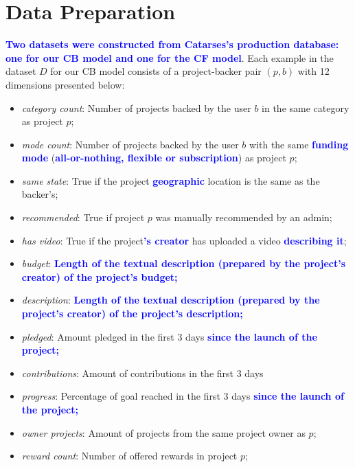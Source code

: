 \documentclass[cic,tc,english]{iiufrgs}
\newcommand{\adriano}[1]{\textcolor{blue}{\textbf{#1}}}
\begin{document}
\section{Data Preparation} \label{data-preparation}
\adriano{Two datasets were constructed from Catarses's production database: one for our CB model and one for the CF model}. Each example in the dataset \(D\) for our CB model consists of a project-backer pair \((p,b)\) with 12 dimensions presented below:
\begin{itemize}

    \item \emph{category count}: Number of projects backed by the user \(b\) in the same category as project \(p\);
    \item \emph{mode count}: Number of projects backed by the user \(b\) with the same \adriano{funding mode} (\adriano{all-or-nothing, flexible or subscription}) as project \(p\);
    \item \emph{same state}: True if the project \adriano{geographic} location is the same as the backer's;
    \item \emph{recommended}: True if project \(p\) was manually recommended by an admin;
    \item \emph{has video}: True if the project\adriano{'s creator} has uploaded a video \adriano{describing it};
    \item \emph{budget}: \adriano{Length of the textual description (prepared by the project's creator) of the project's budget;}
    \item \emph{description}: \adriano{Length of the textual description (prepared by the project's creator) of the project's description;}
    \item \emph{pledged}: Amount pledged in the first 3 days \adriano{since the launch of the project;}
    \item \emph{contributions}: Amount of contributions in the first 3 days
    \item \emph{progress}: Percentage of goal reached in the first 3 days \adriano{since the launch of the project;}
    \item \emph{owner projects}: Amount of projects from the same project owner as \(p\);
    \item \emph{reward count}: Number of offered rewards in project \(p\);
\end{itemize}
\end{document}
